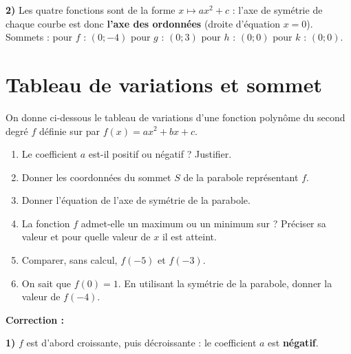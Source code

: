 \documentclass[11pt,a4paper]{book}
\begin{document}
\medskip
\begin{corrBox}
	\textbf{2)} Les quatre fonctions sont de la forme $x\mapsto ax^2+c$ : l'axe de symétrie de chaque courbe est donc \textbf{l'axe des ordonnées} (droite d'équation $x=0$).\\
	Sommets : pour $f$ : $(0 ; -4)$ \quad pour $g$ : $(0 ; 3)$ \quad pour $h$ : $(0 ; 0)$ \quad pour $k$ : $(0 ; 0)$.
\end{corrBox}

\section*{\color{green!55!black}Tableau de variations et sommet}

\exerciceDS{}

On donne ci-dessous le tableau de variations d'une fonction polynôme du second degré $f$ définie sur \R par $f(x)=ax^2+bx+c$.

\begin{center}
\end{center}

\begin{enumerate}[label=\textbf{\arabic*)}]
	\item Le coefficient $a$ est-il positif ou négatif ? Justifier.
	\item Donner les coordonnées du sommet $S$ de la parabole représentant $f$.
	\item Donner l'équation de l'axe de symétrie de la parabole.
	\item La fonction $f$ admet-elle un maximum ou un minimum sur \R ? Préciser sa valeur et pour quelle valeur de $x$ il est atteint.
	\item Comparer, sans calcul, $f(-5)$ et $f(-3)$.
	\item On sait que $f(0)=1$. En utilisant la symétrie de la parabole, donner la valeur de $f(-4)$.
\end{enumerate}

\medskip
\noindent\textbf{\color{red!75!black}Correction :}

\smallskip
\begin{corrBox}
	\textbf{1)} $f$ est d'abord croissante, puis décroissante : le coefficient $a$ est \textbf{négatif}.
\end{corrBox}
\end{document}
